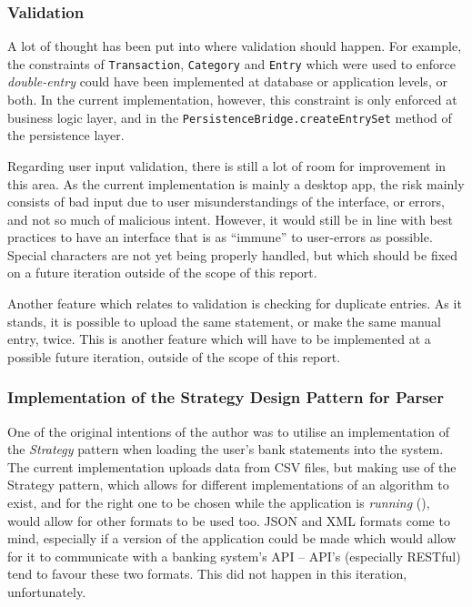 \subsubsection{Validation} \label{sec:Reflections.TimeConstraints.Validation} 
A lot of thought has been put into where validation should happen. For example,
the constraints of \texttt{Transaction}, \texttt{Category} and \texttt{Entry}
which were used to enforce \emph{double-entry} could have been implemented at
database or application levels, or both. In the current implementation,
however, this constraint is only enforced at business logic layer, and in the
\texttt{PersistenceBridge.createEntrySet} method of the persistence layer.

Regarding user input validation, there is still a lot of room for improvement
in this area. As the current implementation is mainly a desktop app, the risk
mainly consists of bad input due to user misunderstandings of the interface, or
errors, and not so much of malicious intent. However, it would still be in line
with best practices to have an interface that is as ``immune'' to user-errors as
possible. Special characters are not yet being properly handled, but which
should be fixed on a future iteration outside of the scope of this report.

Another feature which relates to validation is checking for duplicate entries.
As it stands, it is possible to upload the same statement, or make the same
manual entry, twice. This is another feature which will have to be implemented
at a possible future iteration, outside of the scope of this report.


\subsubsection{Implementation of the Strategy Design Pattern for Parser}
One of the original intentions of the author was to utilise an implementation
of the \emph{Strategy} pattern when loading the user's bank statements into the
system. The current implementation uploads data from CSV files, but making use
of the Strategy pattern, which allows for different implementations of an
algorithm to exist, and for the right one to be chosen while the application is
\emph{running} (\cite[][Ch.~8,~Location~3152]{nikolov2016scala}), would allow
for other formats to be used too. JSON and XML formats come to mind, especially
if a version of the application could be made which would allow for it to
communicate with a banking system's API -- API's (especially RESTful) tend to
favour these two formats. This did not happen in this iteration, unfortunately.

